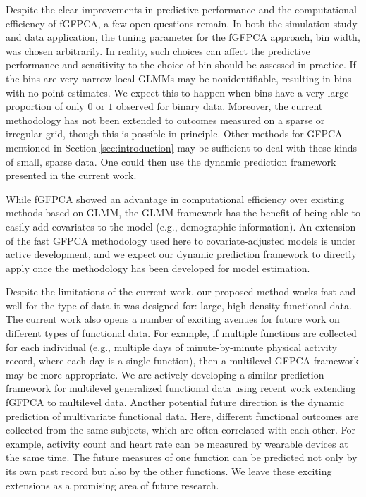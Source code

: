 \documentclass[12pt]{article}
\begin{document}
Despite the clear improvements in predictive performance and the computational efficiency of fGFPCA, a few open questions remain. In both the simulation study and data application, the tuning parameter for the fGFPCA approach, bin width, was chosen arbitrarily. In reality, such choices can affect the predictive performance and sensitivity to the choice of bin should be assessed in practice. If the bins are very narrow local GLMMs may be nonidentifiable, resulting in bins with no point estimates. We expect this to happen when bins have a very large proportion of only $0$ or $1$ observed for binary data. Moreover, the current methodology has not been extended to outcomes measured on a sparse or irregular grid, though this is possible in principle. Other methods for GFPCA mentioned in Section \ref{sec:introduction} may be sufficient to deal with these kinds of small, sparse data. One could then use the dynamic prediction framework presented in the current work. 

While fGFPCA showed an advantage in computational efficiency over existing methods based on GLMM, the GLMM framework has the benefit of being able to easily add covariates to the model (e.g., demographic information). An extension of the fast GFPCA methodology used here to covariate-adjusted models is under active development, and we expect our dynamic prediction framework to directly apply once the methodology has been developed for model estimation. 

Despite the limitations of the current work, our proposed method works fast and well for the type of data it was designed for: large, high-density functional data. The current work also opens a number of exciting avenues for future work on different types of functional data. For example, if multiple functions are collected for each individual (e.g., multiple days of minute-by-minute physical activity record, where each day is a single function), then a multilevel GFPCA framework may be more appropriate. We are actively developing a similar prediction framework for multilevel generalized functional data using recent work extending fGFPCA to multilevel data. Another potential future direction is the dynamic prediction of multivariate functional data. Here, different functional outcomes are collected from the same subjects, which are often correlated with each other. For example, activity count and heart rate can be measured by wearable devices at the same time. The future measures of one function can be predicted not only by its own past record but also by the other functions. We leave these exciting extensions as a promising area of future research.
\end{document}
